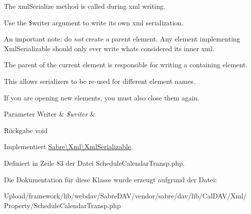 The xml\+Serialize method is called during xml writing.

Use the \$writer argument to write its own xml serialization.

An important note\+: do {\itshape not} create a parent element. Any element implementing Xml\+Serializable should only ever write what\textquotesingle{}s considered its \textquotesingle{}inner xml\textquotesingle{}.

The parent of the current element is responsible for writing a containing element.

This allows serializers to be re-\/used for different element names.

If you are opening new elements, you must also close them again.


\begin{DoxyParams}[1]{Parameter}
Writer & {\em \$writer} & \\
\hline
\end{DoxyParams}
\begin{DoxyReturn}{Rückgabe}
void 
\end{DoxyReturn}


Implementiert \mbox{\hyperlink{interface_sabre_1_1_xml_1_1_xml_serializable_aa78f3ee43aa699be8347181653a53d8c}{Sabre\textbackslash{}\+Xml\textbackslash{}\+Xml\+Serializable}}.



Definiert in Zeile 83 der Datei Schedule\+Calendar\+Transp.\+php.



Die Dokumentation für diese Klasse wurde erzeugt aufgrund der Datei\+:\begin{DoxyCompactItemize}
\item 
Upload/framework/lib/webdav/\+Sabre\+D\+A\+V/vendor/sabre/dav/lib/\+Cal\+D\+A\+V/\+Xml/\+Property/Schedule\+Calendar\+Transp.\+php\end{DoxyCompactItemize}
